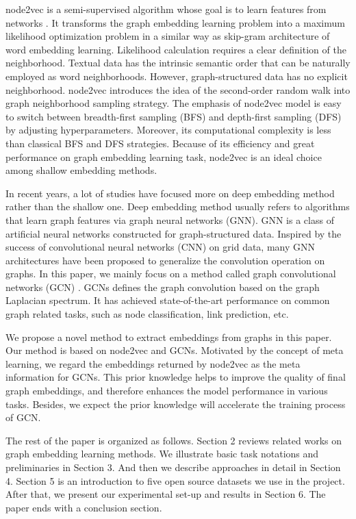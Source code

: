 \documentclass[sigconf]{acmart}
\begin{document}
node2vec is a semi-supervised algorithm whose goal is to learn features from networks \cite{node2vec}. It transforms the graph embedding learning problem into a maximum likelihood optimization problem in a similar way as skip-gram architecture of word embedding learning. Likelihood calculation requires a clear definition of the neighborhood. Textual data has the intrinsic semantic order that can be naturally employed as word neighborhoods. However, graph-structured data has no explicit neighborhood. node2vec introduces the idea of the second-order random walk into graph neighborhood sampling strategy. The emphasis of node2vec model is easy to switch between breadth-first sampling (BFS) and depth-first sampling (DFS) by adjusting hyperparameters. Moreover, its computational complexity is less than classical BFS and DFS strategies. Because of its efficiency and great performance on graph embedding learning task, node2vec is an ideal choice among shallow embedding methods.\par

In recent years, a lot of studies have focused more on deep embedding method rather than the shallow one. Deep embedding method usually refers to algorithms that learn graph features via graph neural networks (GNN). GNN is a class of artificial neural networks constructed for graph-structured data. Inspired by the success of convolutional neural networks (CNN) on grid data, many GNN architectures have been proposed to generalize the convolution operation on graphs. In this paper, we mainly focus on a method called graph convolutional networks (GCN) \cite{gcn}. GCNs defines the graph convolution based on the graph Laplacian spectrum. It has achieved state-of-the-art performance on common graph related tasks, such as node classification, link prediction, etc.\par

We propose a novel method to extract embeddings from graphs in this paper. Our method is based on node2vec and GCNs. Motivated by the concept of meta learning, we regard the embeddings returned by node2vec as the meta information for GCNs. This prior knowledge helps to improve the quality of final graph embeddings, and therefore enhances the model performance in various tasks. Besides, we expect the prior knowledge will accelerate the training process of GCN.\par

The rest of the paper is organized as follows. Section 2 reviews related works on graph embedding learning methods. We illustrate basic task notations and preliminaries in Section 3. And then we describe approaches in detail in Section 4. Section 5 is an introduction to five open source datasets we use in the project. After that, we present our experimental set-up and results in Section 6. The paper ends with a conclusion section.  
\end{document}
